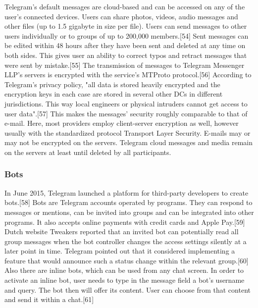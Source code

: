 \documentclass[12pt]{article}
\begin{document}
Telegram's default messages are cloud-based and can be accessed on any of the user's connected devices. Users can share photos, videos, audio messages and other files (up to 1.5 gigabyte in size per file). Users can send messages to other users individually or to groups of up to 200,000 members.[54] Sent messages can be edited within 48 hours after they have been sent and deleted at any time on both sides. This gives user an ability to correct typos and retract messages that were sent by mistake.[55] The transmission of messages to Telegram Messenger LLP's servers is encrypted with the service's MTProto protocol.[56] According to Telegram's privacy policy, "all data is stored heavily encrypted and the encryption keys in each case are stored in several other DCs in different jurisdictions. This way local engineers or physical intruders cannot get access to user data".[57] This makes the messages' security roughly comparable to that of e-mail. Here, most providers employ client-server encryption as well, however usually with the standardized protocol Transport Layer Security. E-mails may or may not be encrypted on the servers. Telegram cloud messages and media remain on the servers at least until deleted by all participants. 







\subsubsection{Bots}


In June 2015, Telegram launched a platform for third-party developers to create bots.[58] Bots are Telegram accounts operated by programs. They can respond to messages or mentions, can be invited into groups and can be integrated into other programs. It also accepts online payments with credit cards and Apple Pay.[59] Dutch website Tweakers reported that an invited bot can potentially read all group messages when the bot controller changes the access settings silently at a later point in time. Telegram pointed out that it considered implementing a feature that would announce such a status change within the relevant group.[60] Also there are inline bots, which can be used from any chat screen. In order to activate an inline bot, user needs to type in the message field a bot's username and query. The bot then will offer its content. User can choose from that content and send it within a chat.[61]
\end{document}
